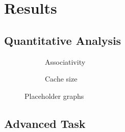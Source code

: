 \section{Results}

\subsection{Quantitative Analysis}

\begin{figure}[ht]
    \centering
    \begin{subfigure}[b]{0.45\textwidth}
        \centering
        \caption{Associativity}
        \label{fig:associativity}
    \end{subfigure}
    \hfill
    \begin{subfigure}[b]{0.45\textwidth}
        \centering
        \caption{Cache size}
        \label{fig:cache_size}
    \end{subfigure}
    \hfill
    \caption{Placeholder graphs}
    \label{fig:placeholder}
\end{figure}



\subsection{Advanced Task}\label{results:advanced}
